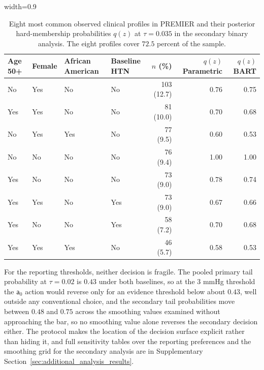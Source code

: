 \documentclass[11pt]{article}
\theoremstyle{definition}
\theoremstyle{plain}
\begin{document}
\begin{table}[!htbp]
  \centering
  \caption{Eight most common observed clinical profiles in PREMIER and their posterior hard-membership probabilities $q(z)$ at $\tau=0.035$ in the secondary binary analysis. The eight profiles cover $72.5$ percent of the sample.}
  \begin{adjustbox}{width=0.9\textwidth}
  \begin{tabular}{l l l l r r r}
    \toprule
    \textbf{Age 50+} & \textbf{Female} & \textbf{African American} & \textbf{Baseline HTN} & \textbf{$n$ (\%)} & \textbf{$q(z)$ Parametric} & \textbf{$q(z)$ BART} \\
    \midrule
    No  & Yes & No  & No  & 103 (12.7) & 0.76 & 0.75 \\
    Yes & Yes & No  & No  & 81 (10.0)  & 0.70 & 0.68 \\
    No  & Yes & Yes & No  & 77 (9.5)   & 0.60 & 0.53 \\
    No  & No  & No  & No  & 76 (9.4)   & 1.00 & 1.00 \\
    Yes & No  & No  & No  & 73 (9.0)   & 0.78 & 0.74 \\
    Yes & Yes & No  & Yes & 73 (9.0)   & 0.67 & 0.66 \\
    Yes & No  & No  & Yes & 58 (7.2)   & 0.70 & 0.68 \\
    Yes & Yes & Yes & No  & 46 (5.7)   & 0.58 & 0.53 \\
    \bottomrule
  \end{tabular}
  \end{adjustbox}
  \label{tab:premier_profile_summary}
\end{table}

For the reporting thresholds, neither decision is fragile. The pooled primary tail probability at $\tau=0.02$ is $0.43$ under both baselines, so at the $3$ mmHg threshold the $\mathsf a_0$ action would reverse only for an evidence threshold below about $0.43$, well outside any conventional choice, and the secondary tail probabilities move between $0.48$ and $0.75$ across the smoothing values examined without approaching the bar, so no smoothing value alone reverses the secondary decision either. The protocol makes the location of the decision surface explicit rather than hiding it, and full sensitivity tables over the reporting preferences and the smoothing grid for the secondary analysis are in Supplementary Section~\ref{sec:additional_analysis_results}.
\end{document}
